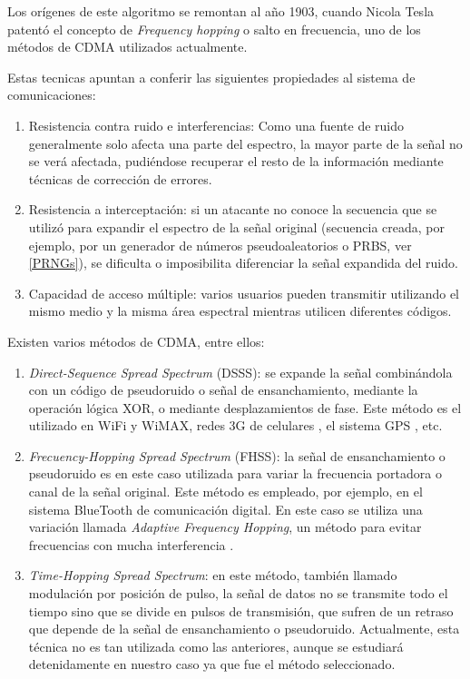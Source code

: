 Los orígenes de este algoritmo se remontan al año 1903, cuando Nicola Tesla patentó el concepto de \textit{Frequency hopping} o salto en frecuencia, uno de los métodos de CDMA utilizados actualmente.

Estas tecnicas apuntan a conferir las siguientes propiedades al sistema de comunicaciones:
\begin{enumerate} 
\item Resistencia contra ruido e interferencias: Como una fuente de ruido generalmente solo afecta una parte del espectro, la mayor parte de la señal no se verá afectada, pudiéndose recuperar el resto de la información mediante técnicas de corrección de errores.
\item Resistencia a interceptación: si un atacante no conoce la secuencia que se utilizó para expandir el espectro de la señal original (secuencia creada, por ejemplo, por un generador de números pseudoaleatorios o PRBS, ver \ref{PRNGs}), se dificulta o imposibilita diferenciar la señal expandida del ruido.
\item Capacidad de acceso múltiple: varios usuarios pueden transmitir utilizando el mismo medio y la misma área espectral mientras utilicen diferentes códigos.
\end{enumerate} 

Existen varios métodos de CDMA, entre ellos:
\begin{enumerate} 
\item \textit{Direct-Sequence Spread Spectrum} (DSSS): se expande la señal combinándola con un código de pseudoruido o señal de ensanchamiento, mediante la operación lógica XOR, o mediante desplazamientos de fase. Este método es el utilizado en WiFi y WiMAX, redes 3G de celulares \cite{dixon1994spread}, el sistema GPS \cite{kaplan2005understanding}, etc.
\item \textit{Frecuency-Hopping Spread Spectrum} (FHSS): la señal de ensanchamiento o pseudoruido es en este caso utilizada para variar la frecuencia portadora o canal de la señal original. Este método es empleado, por ejemplo, en el sistema BlueTooth de comunicación digital. En este caso se utiliza una variación llamada \textit{Adaptive Frequency Hopping}, un método para evitar frecuencias con mucha interferencia \cite{golmie2003bluetooth}.
\item \textit{Time-Hopping Spread Spectrum}: en este método, también llamado modulación por posición de pulso, la señal de datos no se transmite todo el tiempo sino que se divide en pulsos de transmisión, que sufren de un retraso que depende de la señal de ensanchamiento o pseudoruido. Actualmente, esta técnica no es tan utilizada como las anteriores, aunque se estudiará detenidamente en nuestro caso ya que fue el método seleccionado.
\end{enumerate} 


